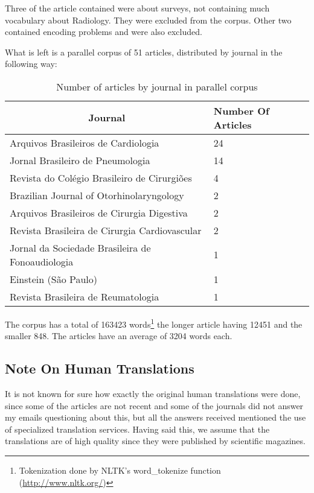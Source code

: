 Three of the article contained were about surveys, not containing much vocabulary about Radiology. They were excluded from the corpus. Other two contained encoding problems and were also excluded.

What is left is a parallel corpus of 51 articles, distributed by journal in the following way:

\begin{table}[ht]
\centering
\caption{Number of articles by journal in parallel corpus}
\label{table:articles_by_journal}
\begin{tabular}{@{}ll@{}}
\toprule
\multicolumn{1}{c}{\textbf{Journal}}                 & \textbf{Number Of Articles} \\ \midrule
Arquivos Brasileiros de Cardiologia         & 24                          \\
Jornal Brasileiro de Pneumologia            & 14                          \\
Revista do Colégio Brasileiro de Cirurgiões & 4                           \\
Brazilian Journal of Otorhinolaryngology    & 2                           \\
Arquivos Brasileiros de Cirurgia Digestiva  & 2                           \\
Revista Brasileira de Cirurgia Cardiovascular        & 2                           \\
Jornal da Sociedade Brasileira de Fonoaudiologia     & 1                           \\
Einstein (São Paulo)                                 & 1                           \\
Revista Brasileira de Reumatologia                   & 1                           \\ \bottomrule
\end{tabular}
\end{table}

The corpus has a total of 163423 words\footnote{Tokenization done by NLTK's word\_tokenize function (\url{http://www.nltk.org/})} the longer article having 12451 and the smaller 848. The articles have an average of 3204 words each. 

\subsection{Note On Human Translations}

It is not known for sure how exactly the original human translations were done, since some of the articles are not recent and some of the journals did not answer my emails questioning about this, but all the answers received mentioned the use of specialized translation services. Having said this, we assume that the translations are of high quality since they were published by scientific magazines. 

